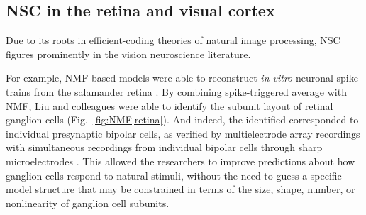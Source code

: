 \subsection*{NSC in the retina and visual cortex}

Due to its roots in efficient-coding theories of natural image processing,
\ac{NSC} figures prominently in the vision neuroscience literature.

For example, \ac{NMF}-based models were able to reconstruct
\emph{in vitro} neuronal spike trains from the salamander retina 
\cite{Onken2016,Liu2017}.
By combining spike-triggered average with \ac{NMF},
Liu and colleagues \cite{Liu2017} were able to identify the subunit layout
of retinal ganglion cells
(Fig.~\ref{fig:NMF|retina}).
And indeed, the identified  corresponded to 
individual presynaptic bipolar cells,
as verified by multielectrode array recordings with simultaneous recordings from
individual bipolar cells through sharp microelectrodes \cite{Liu2017}.
This allowed the researchers to improve predictions about how ganglion cells respond
to natural stimuli, without the need to guess a specific model structure that may be constrained in terms of the size, shape, number, or nonlinearity of 
ganglion cell subunits.

